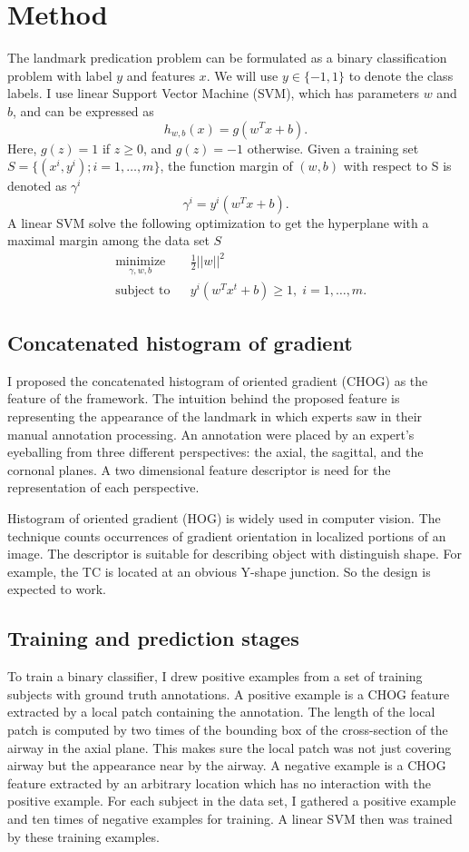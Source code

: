 \documentclass{article}
\begin{document}
\section{Method}
\label{sec:method}

The landmark predication problem can be formulated as a binary classification problem with label $y$ and features $x$.
We will use $y \in \{-1,1\}$ to denote the class labels. 
I use linear Support Vector Machine (SVM), which has parameters $w$ and $b$, and can be expressed as
\[
h_{w,b}(x) = g(w^Tx + b).
\]
Here, $g(z)=1$ if $z \geq 0$, and $g(z)=-1$ otherwise.
Given a training set $S=\{(x^i,y^i); i=1,\ldots,m\}$, the function margin of $(w,b)$ with respect to S is denoted as $\gamma^i$
\[\gamma^i = y^i(w^Tx+b).\]
A linear SVM solve the following optimization to get the hyperplane with a maximal margin among the data set $S$
\begin{equation*}
\begin{aligned}
& \underset{\gamma,w,b}{\text{minimize}}
& & \frac{1}{2}||w||^2 \\
& \text{subject to}
& & y^i(w^Tx^t + b) \geq 1, \; i = 1, \ldots, m.
\end{aligned}
\end{equation*}


\subsection{Concatenated histogram of gradient}
I proposed the concatenated histogram of oriented gradient (CHOG) as the feature of the framework.
The intuition behind the proposed feature is representing the appearance of the landmark in which experts saw in their manual annotation processing.
An annotation were placed by an expert's eyeballing from three different perspectives: the axial, the sagittal, and the cornonal planes.
A two dimensional feature descriptor is need for the representation of each perspective.

Histogram of oriented gradient (HOG) is widely used in computer vision.
The technique counts occurrences of gradient orientation in localized portions of an image.
The descriptor is suitable for describing object with distinguish shape.
For example, the TC is located at an obvious Y-shape junction.
So the design is expected to work.

\subsection{Training and prediction stages}
To train a binary classifier, I drew positive examples from a set of training subjects with ground truth annotations.
A positive example is a CHOG feature extracted by a local patch containing the annotation.
The length of the local patch is computed by two times of the bounding box of the cross-section of the airway in the axial plane. 
This makes sure the local patch was not just covering airway but the appearance near by the airway.
A negative example is a CHOG feature extracted by an arbitrary location which has no interaction with the positive example.
For each subject in the data set, I gathered a positive example and ten times of negative examples for training.
A linear SVM then was trained by these training examples.
\end{document}
